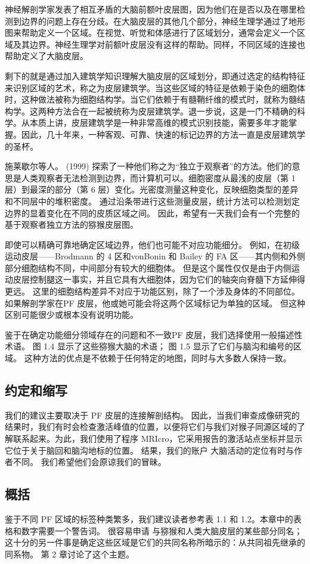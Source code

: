 \par
神经解剖学家发表了相互矛盾的大脑前额叶皮层图，因为他们在是否以及在哪里检测到边界的问题上存在分歧。在大脑皮层的其他几个部分，神经生理学通过了地形图来帮助定义一个区域。在视觉、听觉和体感进行了区域划分，通常会定义一个区域及其边界。神经生理学对前额叶皮层没有这样的帮助。同样，不同区域的连接也帮助定义了大脑皮层。
\par
剩下的就是通过加入建筑学知识理解大脑皮层的区域划分，即通过选定的结构特征来识别区域的艺术，称之为皮层建筑学。当这些区域的特征是依赖于染色的细胞体时，这种做法被称为细胞结构学。当它们依赖于有髓鞘纤维的模式时，就称为髓结构学。这两种方法合在一起被统称为皮层建筑学。退一步说，这是一门不精确的科学。从本质上讲，皮层建筑学是一种非常高维的模式识别技能，需要多年才能掌握。因此，几十年来，一种客观、可靠、快速的标记边界的方法一直是皮层建筑学的圣杯。
\par
施莱歇尔等人。 (1999) 探索了一种他们称之为“独立于观察者”的方法。他们的意思是人类观察者无法检测到边界，而计算机可以。细胞密度从最浅的皮层（第 1 层）到最深的部分（第 6 层）变化。光密度测量这种变化，反映细胞类型的差异和不同层中的堆积密度。 通过沿条带进行这些测量皮层，统计方法可以检测划定边界的显着变化在不同的皮质区域之间。 因此，希望有一天我们会有一个完整的基于观察者独立方法的猕猴皮层图。
\par
即使可以精确可靠地确定区域边界，他们也可能不对应功能细分。 例如，在初级运动皮层——Brodmann 的 4 区和vonBonin 和 Bailey 的 FA 区——其内侧和外侧部分细胞结构不同，中间部分有较大的细胞体。 但是这个属性仅仅是由于内侧运动皮层控制腿这一事实，并且它具有大细胞体，因为它们的轴突向脊髓下方延伸得更远。 这里的细胞结构差异不对应于功能区别，除了一个涉及身体的不同部位。 如果解剖学家在PF 皮层，他或她可能会将这两个区域标记为单独的区域。 但这种区别可能很少或根本没有说明功能。
\par
鉴于在确定功能细分领域存在的问题和不一致PF 皮层，我们选择使用一般描述性术语。 图 1.4 显示了这些猕猴大脑的术语； 图 1.5 显示了它们与脑沟和编号的区域。 这种方法的优点是不依赖于任何特定的地图，同时与大多数人保持一致。
\subsection{约定和缩写}
我们的建议主要取决于 PF 皮层的连接解剖结构。 因此，当我们审查成像研究的结果时，我们有时会检查激活峰值的位置，以便将它们与我们对猴子同源区域的了解联系起来。为此，我们使用了程序 MRIcro，它采用报告的激活站点坐标并显示它位于关于脑回和脑沟地标的位置。 结果，我们的账户
大脑活动的定位有时与作者不同。 我们希望他们会原谅我们的冒昧。
\subsection{概括}
鉴于不同 PF 区域的标签种类繁多，我们建议读者参考表 1.1 和 1.2。本章中的表格和数字需要一个警告词。 很容易申请
与猕猴和人类大脑皮层的某些部分同名； 这十分的另一件事是确定这些区域是它们的共同名称所暗示的：从共同祖先继承的同系物。 第 2 章讨论了这个主题。
\par
\par






